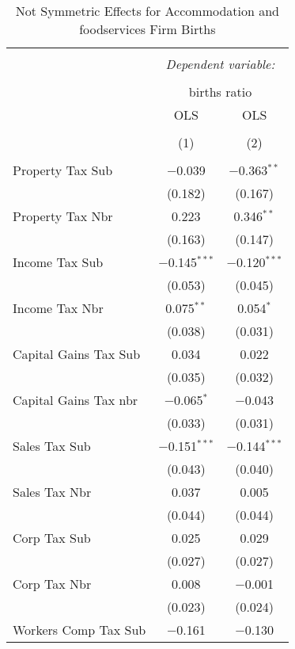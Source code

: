 
\begin{table}[!htbp] \centering 
  \caption{Not Symmetric Effects for  Accommodation and foodservices Firm Births} 
  \label{72noequality} 
\footnotesize 
\begin{tabular}{@{\extracolsep{5pt}}lcc} 
\\[-1.8ex]\hline 
\hline \\[-1.8ex] 
 & \multicolumn{2}{c}{\textit{Dependent variable:}} \\ 
\cline{2-3} 
\\[-1.8ex] & \multicolumn{2}{c}{births ratio} \\ 
 & OLS & OLS \\ 
\\[-1.8ex] & (1) & (2)\\ 
\hline \\[-1.8ex] 
 Property Tax Sub & $-$0.039 & $-$0.363$^{**}$ \\ 
  & (0.182) & (0.167) \\ 
  Property Tax Nbr & 0.223 & 0.346$^{**}$ \\ 
  & (0.163) & (0.147) \\ 
  Income Tax Sub & $-$0.145$^{***}$ & $-$0.120$^{***}$ \\ 
  & (0.053) & (0.045) \\ 
  Income Tax Nbr & 0.075$^{**}$ & 0.054$^{*}$ \\ 
  & (0.038) & (0.031) \\ 
  Capital Gains Tax Sub & 0.034 & 0.022 \\ 
  & (0.035) & (0.032) \\ 
  Capital Gains Tax nbr & $-$0.065$^{*}$ & $-$0.043 \\ 
  & (0.033) & (0.031) \\ 
  Sales Tax Sub & $-$0.151$^{***}$ & $-$0.144$^{***}$ \\ 
  & (0.043) & (0.040) \\ 
  Sales Tax Nbr & 0.037 & 0.005 \\ 
  & (0.044) & (0.044) \\ 
  Corp Tax Sub & 0.025 & 0.029 \\ 
  & (0.027) & (0.027) \\ 
  Corp Tax Nbr & 0.008 & $-$0.001 \\ 
  & (0.023) & (0.024) \\ 
  Workers Comp Tax Sub & $-$0.161 & $-$0.130 \\ 

\end{tabular}
\end{table}
